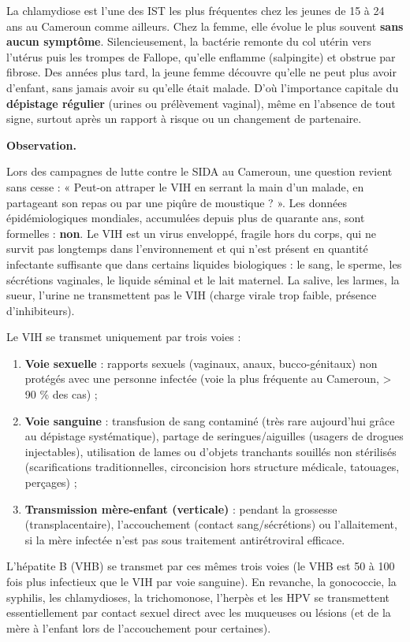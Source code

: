 \documentclass[11pt]{article}
\newcounter{popsec}
\newcounter{popsub}
\newcommand{\courssub}[1]{%
  \stepcounter{popsub}%
  \par\vspace{9pt}\noindent{\popxbold\fontsize{11.5}{13}\selectfont\color{popink}{\color{poporange}\thepopsec.\thepopsub}\hspace{6pt}#1}\par\nopagebreak\vspace{4pt}
}
\begin{document}
\begin{savaistu}
La chlamydiose est l'une des IST les plus fréquentes chez les jeunes de 15 à 24 ans au Cameroun comme ailleurs. Chez la femme, elle évolue le plus souvent \textbf{sans aucun symptôme}. Silencieusement, la bactérie remonte du col utérin vers l'utérus puis les trompes de Fallope, qu'elle enflamme (salpingite) et obstrue par fibrose. Des années plus tard, la jeune femme découvre qu'elle ne peut plus avoir d'enfant, sans jamais avoir su qu'elle était malade. D'où l'importance capitale du \textbf{dépistage régulier} (urines ou prélèvement vaginal), même en l'absence de tout signe, surtout après un rapport à risque ou un changement de partenaire.
\end{savaistu}

\courssub{Les modes de transmission : focus sur le VIH}

\textbf{Observation.}\par
Lors des campagnes de lutte contre le SIDA au Cameroun, une question revient sans cesse : « Peut-on attraper le VIH en serrant la main d'un malade, en partageant son repas ou par une piqûre de moustique ? ». Les données épidémiologiques mondiales, accumulées depuis plus de quarante ans, sont formelles : \textbf{non}. Le VIH est un virus enveloppé, fragile hors du corps, qui ne survit pas longtemps dans l'environnement et qui n'est présent en quantité infectante suffisante que dans certains liquides biologiques : le sang, le sperme, les sécrétions vaginales, le liquide séminal et le lait maternel. La salive, les larmes, la sueur, l'urine ne transmettent pas le VIH (charge virale trop faible, présence d'inhibiteurs).

\begin{propriete}
Le VIH se transmet uniquement par trois voies :
\begin{enumerate}
\item \textbf{Voie sexuelle} : rapports sexuels (vaginaux, anaux, bucco-génitaux) non protégés avec une personne infectée (voie la plus fréquente au Cameroun, > 90 \% des cas) ;
\item \textbf{Voie sanguine} : transfusion de sang contaminé (très rare aujourd'hui grâce au dépistage systématique), partage de seringues/aiguilles (usagers de drogues injectables), utilisation de lames ou d'objets tranchants souillés non stérilisés (scarifications traditionnelles, circoncision hors structure médicale, tatouages, perçages) ;
\item \textbf{Transmission mère-enfant (verticale)} : pendant la grossesse (transplacentaire), l'accouchement (contact sang/sécrétions) ou l'allaitement, si la mère infectée n'est pas sous traitement antirétroviral efficace.
\end{enumerate}
L'hépatite B (VHB) se transmet par ces mêmes trois voies (le VHB est 50 à 100 fois plus infectieux que le VIH par voie sanguine). En revanche, la gonococcie, la syphilis, les chlamydioses, la trichomonose, l'herpès et les HPV se transmettent essentiellement par contact sexuel direct avec les muqueuses ou lésions (et de la mère à l'enfant lors de l'accouchement pour certaines).
\end{propriete}
\end{document}
